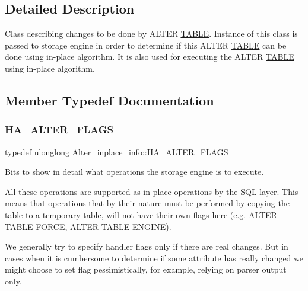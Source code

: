 \subsection{Detailed Description}
Class describing changes to be done by A\+L\+T\+ER \mbox{\hyperlink{structTABLE}{T\+A\+B\+LE}}. Instance of this class is passed to storage engine in order to determine if this A\+L\+T\+ER \mbox{\hyperlink{structTABLE}{T\+A\+B\+LE}} can be done using in-\/place algorithm. It is also used for executing the A\+L\+T\+ER \mbox{\hyperlink{structTABLE}{T\+A\+B\+LE}} using in-\/place algorithm. 

\subsection{Member Typedef Documentation}
\mbox{\label{classAlter__inplace__info_a45258f36b4942b5cabee7239463daaca}} 
\subsubsection{\texorpdfstring{H\+A\+\_\+\+A\+L\+T\+E\+R\+\_\+\+F\+L\+A\+GS}{HA\_ALTER\_FLAGS}}
{\footnotesize\ttfamily typedef ulonglong \mbox{\hyperlink{classAlter__inplace__info_a45258f36b4942b5cabee7239463daaca}{Alter\+\_\+inplace\+\_\+info\+::\+H\+A\+\_\+\+A\+L\+T\+E\+R\+\_\+\+F\+L\+A\+GS}}}

Bits to show in detail what operations the storage engine is to execute.

All these operations are supported as in-\/place operations by the S\+QL layer. This means that operations that by their nature must be performed by copying the table to a temporary table, will not have their own flags here (e.\+g. A\+L\+T\+ER \mbox{\hyperlink{structTABLE}{T\+A\+B\+LE}} F\+O\+R\+CE, A\+L\+T\+ER \mbox{\hyperlink{structTABLE}{T\+A\+B\+LE}} E\+N\+G\+I\+NE).

We generally try to specify handler flags only if there are real changes. But in cases when it is cumbersome to determine if some attribute has really changed we might choose to set flag pessimistically, for example, relying on parser output only. 

